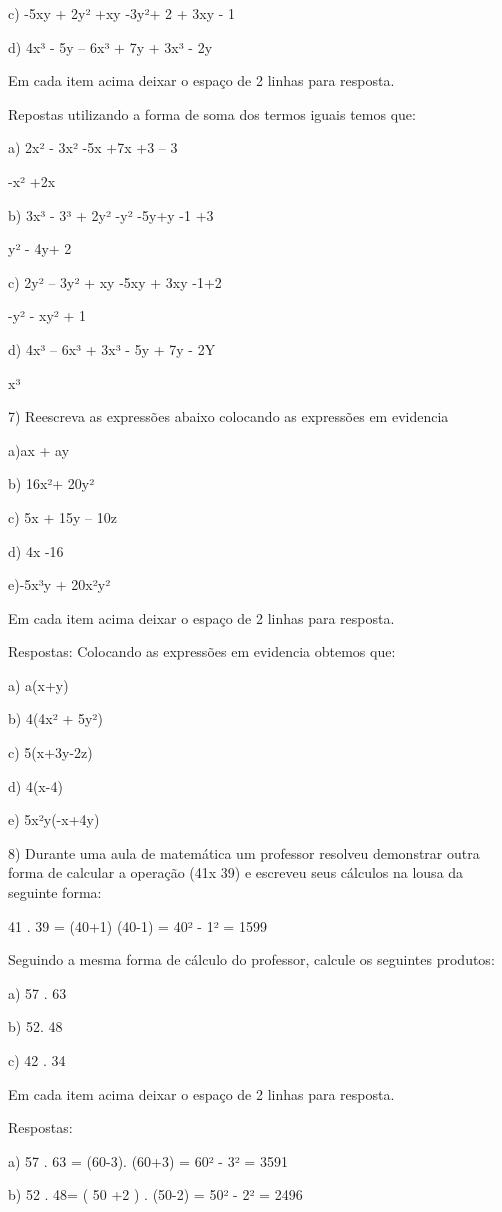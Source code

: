 {c) -5xy + 2y² +xy -3y²+ 2 + 3xy - 1

d) 4x³ - 5y -- 6x³ + 7y + 3x³ - 2y

Em cada item acima deixar o espaço de 2 linhas para resposta.

Repostas utilizando a forma de soma dos termos iguais temos que:

a) 2x² - 3x² -5x +7x +3 -- 3

-x² +2x

b) 3x³ - 3³ + 2y² -y² -5y+y -1 +3

y² - 4y+ 2

c) 2y² -- 3y² + xy -5xy + 3xy -1+2

-y² - xy² + 1

d) 4x³ -- 6x³ + 3x³ - 5y + 7y - 2Y

x³

7) Reescreva as expressões abaixo colocando as expressões em evidencia

a)ax + ay

b) 16x²+ 20y²

c) 5x + 15y -- 10z

d) 4x -16

e)-5x³y + 20x²y²

Em cada item acima deixar o espaço de 2 linhas para resposta.

Respostas: Colocando as expressões em evidencia obtemos que:

a) a(x+y)

b) 4(4x² + 5y²)

c) 5(x+3y-2z)

d) 4(x-4)

e) 5x²y(-x+4y)

8) Durante uma aula de matemática um professor resolveu demonstrar outra
forma de calcular a operação (41x 39) e escreveu seus cálculos na lousa
da seguinte forma:

41 . 39 = (40+1) (40-1) = 40² - 1² = 1599

Seguindo a mesma forma de cálculo do professor, calcule os seguintes
produtos:

a) 57 . 63

b) 52. 48

c) 42 . 34

Em cada item acima deixar o espaço de 2 linhas para resposta.

Respostas:

a) 57 . 63 = (60-3). (60+3) = 60² - 3² = 3591

b) 52 . 48= ( 50 +2 ) . (50-2) = 50² - 2² = 2496

}
